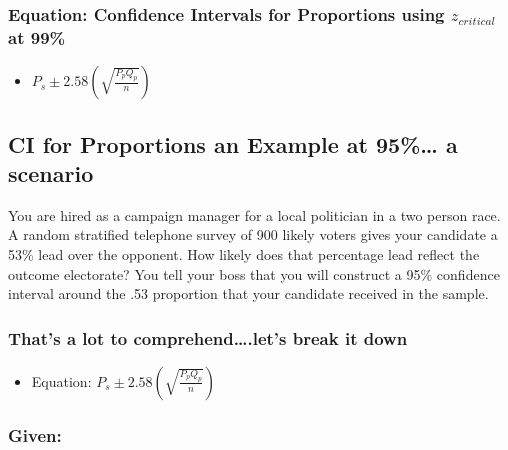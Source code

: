\documentclass[]{article}
\begin{document}
\subsubsection{Equation: Confidence Intervals for Proportions using
$z_{critical}$ at
99\%}\label{equation-confidence-intervals-for-proportions-using-zux5fcritical-at-99}

\begin{itemize}
\itemsep1pt\parskip0pt
\item
  $P_s \pm 2.58(\sqrt{\frac{P_p Q_p}{n}})$
\end{itemize}

\subsection{CI for Proportions an Example at 95\%\ldots{} a
scenario}\label{ci-for-proportions-an-example-at-95-a-scenario}

You are hired as a campaign manager for a local politician in a two
person race. A random stratified telephone survey of 900 likely voters
gives your candidate a 53\% lead over the opponent. How likely does that
percentage lead reflect the outcome electorate? You tell your boss that
you will construct a 95\% confidence interval around the .53 proportion
that your candidate received in the sample.

\subsubsection{That's a lot to comprehend\ldots{}.let's break it
down}\label{thats-a-lot-to-comprehend.lets-break-it-down}

\begin{itemize}
\itemsep1pt\parskip0pt
\item
  Equation: $P_s \pm 2.58(\sqrt{\frac{P_p Q_p}{n}})$
\end{itemize}

\subsubsection{Given:}\label{given}
\end{document}
